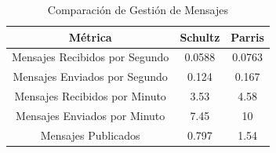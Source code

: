 \begin{table}[H]
\centering
\begin{tabular}{|c|c|c|}
\hline
\textbf{Métrica} & \textbf{Schultz} & \textbf{Parris} \\
\hline
\hspace{30pt}Mensajes Recibidos por Segundo\hspace{30pt} &
\hspace{30pt}0.0588\hspace{30pt} & 
\hspace{30pt}0.0763\hspace{30pt} \\
\hline
\hspace{30pt}Mensajes Enviados por Segundo\hspace{30pt} &
\hspace{30pt}0.124\hspace{30pt} & 
\hspace{30pt}0.167\hspace{30pt} \\
\hline
\hspace{30pt}Mensajes Recibidos por Minuto\hspace{30pt} &
\hspace{30pt}3.53\hspace{30pt} & 
\hspace{30pt}4.58\hspace{30pt} \\
\hline
\hspace{30pt}Mensajes Enviados por Minuto\hspace{30pt} &
\hspace{30pt}7.45\hspace{30pt} & 
\hspace{30pt}10\hspace{30pt} \\
\hline
\hspace{30pt}Mensajes Publicados\hspace{30pt} &
\hspace{30pt}0.797\hspace{30pt} & 
\hspace{30pt}1.54\hspace{30pt} \\
\hline
\end{tabular}
\caption{Comparación de Gestión de Mensajes}
\label{messages_com}
\end{table}
